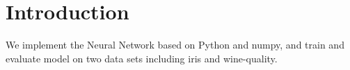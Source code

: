 \section{Introduction}
We implement the Neural Network based on Python and numpy, and train and evaluate model on two data sets including iris and wine-quality.
